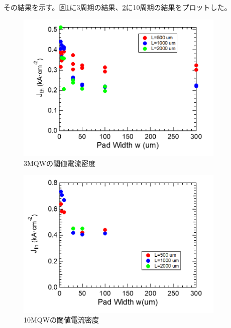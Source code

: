 その結果を示す。図\ref{fig:fig_3_1_3QW_broadcontact_Ith}に3周期の結果、\ref{fig:fig_3_1_10QW_broadcontact_Ith}に10周期の結果をプロットした。
\begin{figure}[h]
	\centering
	\includegraphics[width=10cm]{figure/fig_3_1_3QW_broadcontact_Jth.png}
		\caption{3MQWの閾値電流密度}
		\label{fig:fig_3_1_3QW_broadcontact_Ith}
\end{figure}

\begin{figure}[h]
	\centering
	\includegraphics[width=10cm]{figure/fig_3_1_10QW_broadcontact_Jth.png}
		\caption{10MQWの閾値電流密度}
		\label{fig:fig_3_1_10QW_broadcontact_Ith}
\end{figure}
\clearpage
